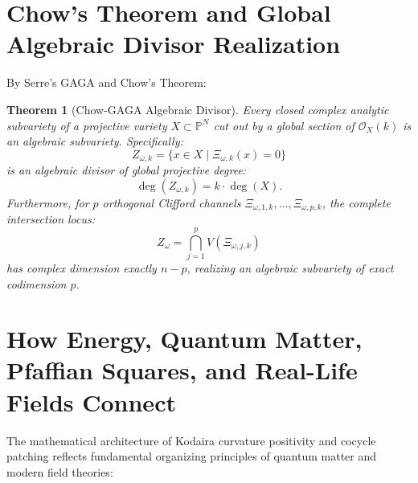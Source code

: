 \documentclass[11pt,a4paper]{article}
\newtheorem{theorem}{Theorem}[section]
\theoremstyle{definition}
\begin{document}
\section{Chow's Theorem and Global Algebraic Divisor Realization}

By Serre's GAGA and Chow's Theorem:
\begin{theorem}[Chow-GAGA Algebraic Divisor]
Every closed complex analytic subvariety of a projective variety $X \subset \mathbb{P}^N$ cut out by a global section of $\mathcal{O}_X(k)$ is an algebraic subvariety. Specifically:
\begin{equation}
  Z_{\omega, k} = \{ x \in X \mid \Xi_{\omega, k}(x) = 0 \}
\end{equation}
is an algebraic divisor of global projective degree:
\begin{equation}
  \deg(Z_{\omega, k}) = k \cdot \deg(X).
\end{equation}
Furthermore, for $p$ orthogonal Clifford channels $\Xi_{\omega, 1, k}, \dots, \Xi_{\omega, p, k}$, the complete intersection locus:
\begin{equation}
  Z_\omega = \bigcap_{j=1}^p V(\Xi_{\omega, j, k})
\end{equation}
has complex dimension exactly $n - p$, realizing an algebraic subvariety of exact codimension $p$.
\end{theorem}

\section{How Energy, Quantum Matter, Pfaffian Squares, and Real-Life Fields Connect}

The mathematical architecture of Kodaira curvature positivity and cocycle patching reflects fundamental organizing principles of quantum matter and modern field theories:
\end{document}
